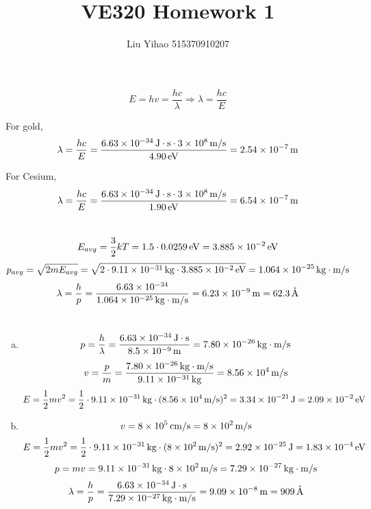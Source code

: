 \documentclass{article}
\title{VE320 Homework 1}
\author{Liu Yihao 515370910207}
\date{}
\newcommand{\unit}[1]{{\rm\,#1}}
\begin{document}
\maketitle

\section{}
$$E=hv=\frac{hc}{\lambda}\Longrightarrow\lambda=\frac{hc}{E}$$

For gold,
$$\lambda=\frac{hc}{E}=\frac{6.63\times10^{-34}\unit{J\cdot s}\cdot3\times10^8\unit{m/s}}{4.90\unit{eV}}=2.54\times10^{-7}\unit{m}$$

For Cesium,
$$\lambda=\frac{hc}{E}=\frac{6.63\times10^{-34}\unit{J\cdot s}\cdot3\times10^8\unit{m/s}}{1.90\unit{eV}}=6.54\times10^{-7}\unit{m}$$

\section{}
$$E_{avg}=\frac{3}{2}kT=1.5\cdot 0.0259\unit{eV}=3.885\times10^{-2}\unit{eV}$$
$$p_{avg}=\sqrt{2mE_{avg}}=\sqrt{2\cdot9.11\times10^{-31}\unit{kg}\cdot3.885\times10^{-2}\unit{eV}}=1.064\times10^{-25}\unit{kg\cdot m/s}$$
$$\lambda=\frac{h}{p}=\frac{6.63\times10^{-34}}{1.064\times10^{-25}\unit{kg\cdot m/s}}=6.23\times10^{-9}\unit{m}=62.3\unit{\mathring{A}}$$

\section{}
\begin{enumerate}[(a)]
\item
$$p=\frac{h}{\lambda}=\frac{6.63\times10^{-34}\unit{J\cdot s}}{8.5\times10^{-9}\unit{m}}=7.80\times10^{-26}\unit{kg\cdot m/s}$$
$$v=\frac{p}{m}=\frac{7.80\times10^{-26}\unit{kg\cdot m/s}}{9.11\times10^{-31}\unit{kg}}=8.56\times10^4\unit{m/s}$$
$$E=\frac{1}{2}mv^2=\frac{1}{2}\cdot9.11\times10^{-31}\unit{kg}\cdot(8.56\times10^4\unit{m/s})^2=3.34\times10^{-21}\unit{J}=2.09\times10^{-2}\unit{eV}$$
\item
$$v=8\times10^5\unit{cm/s}=8\times10^2\unit{m/s}$$
$$E=\frac{1}{2}mv^2=\frac{1}{2}\cdot9.11\times10^{-31}\unit{kg}\cdot(8\times10^2\unit{m/s})^2=2.92\times10^{-25}\unit{J}=1.83\times10^{-4}\unit{eV}$$
$$p=mv=9.11\times10^{-31}\unit{kg}\cdot8\times10^2\unit{m/s}=7.29\times10^{-27}\unit{kg\cdot m/s}$$
$$\lambda=\frac{h}{p}=\frac{6.63\times10^{-34}\unit{J\cdot s}}{7.29\times10^{-27}\unit{kg\cdot m/s}}=9.09\times10^{-8}\unit{m}=909\unit{\mathring{A}}$$
\end{enumerate}
\end{document}
